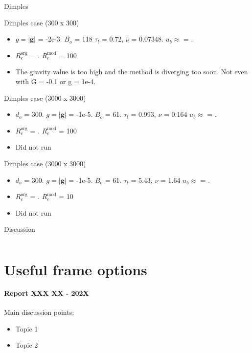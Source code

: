 \documentclass[9pt]{beamer}
\begin{document}
	\begin{frame}[t]{Dimples}
			
		Dimples case (300 x 300)
		\begin{itemize}
			\item $g = \vert \mathbf{g}\vert $ = -2e-3. $B_o$ = 118 $\tau_l$ = 0.72, $\nu$ = 0.07348. $u_b \approx$ = . 
			\item $R_e^{\text{org}}$ = . $R_e^{\text{mod}}$ = 100
			\item The gravity value is too high and the method is diverging too soon. Not even with G = -0.1 or g = 1e-4.
		\end{itemize}	
	
		Dimples case (3000 x 3000)
		\begin{itemize}
		\item $d_o$ = 300. $g = \vert \mathbf{g}\vert $ = -1e-5. $B_o$ = 61. $\tau_l$ = 0.993, $\nu$ = 0.164 $u_b \approx$ = . 
		\item $R_e^{\text{org}}$ = . $R_e^{\text{mod}}$ = 100
		\item Did not run
	\end{itemize}	
	Dimples case (3000 x 3000)
		\begin{itemize}
			\item $d_o$ = 300. $g = \vert \mathbf{g}\vert $ = -1e-5. $B_o$ = 61. $\tau_l$ = 5.43, $\nu$ = 1.64 $u_b \approx$ = . 
			\item $R_e^{\text{org}}$ = . $R_e^{\text{mod}}$ = 10
			\item Did not run
		\end{itemize}		
	\end{frame}

	\begin{frame}{Discussion}
	\begin{columns}
		
		
		
		
	\end{columns}
	\end{frame}



	\section*{Useful frame options}
	\label{}
	\justifying
	\begin{frame}
		\textbf{Report XXX XX - 202X}\\~\\
		Main discussion points:
		\begin{itemize}
			\item Topic 1
			\item Topic 2
		\end{itemize}
	\end{frame}
\end{document}
